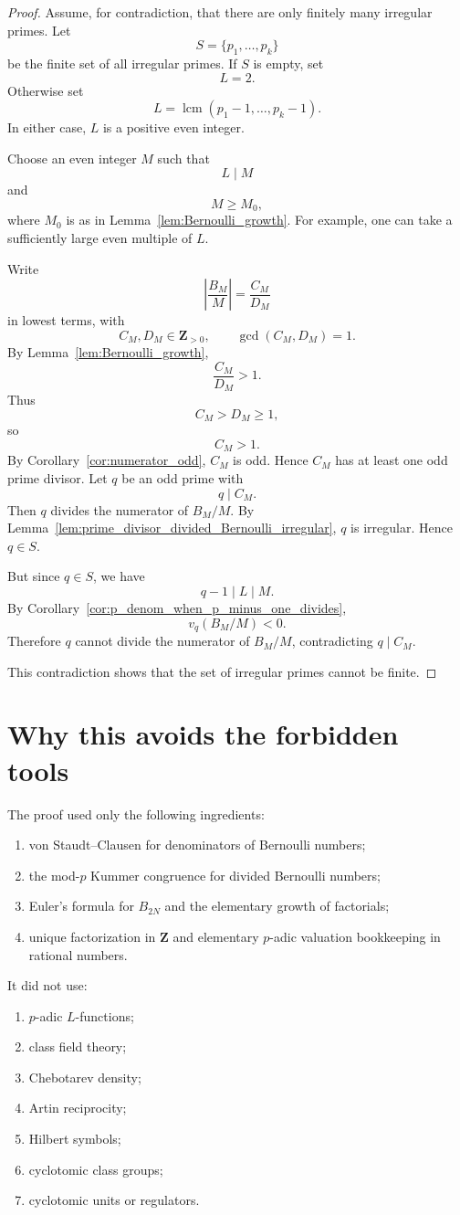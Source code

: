 \documentclass[11pt]{article}
\newcommand{\Z}{\mathbf Z}
\newcommand{\lcm}{\operatorname{lcm}}
\begin{document}
\begin{proof}
Assume, for contradiction, that there are only finitely many irregular primes.  Let
\[
  S=\{p_1,\dots,p_k\}
\]
be the finite set of all irregular primes.  If $S$ is empty, set
\[
  L=2.
\]
Otherwise set
\[
  L=\lcm(p_1-1,\dots,p_k-1).
\]
In either case, $L$ is a positive even integer.

Choose an even integer $M$ such that
\[
  L\mid M
\]
and
\[
  M\ge M_0,
\]
where $M_0$ is as in Lemma~\ref{lem:Bernoulli_growth}.  For example, one can take a sufficiently large even multiple of $L$.

Write
\[
  \left|\frac{B_M}{M}\right|=\frac{C_M}{D_M}
\]
in lowest terms, with
\[
  C_M,D_M\in\Z_{>0},\qquad \gcd(C_M,D_M)=1.
\]
By Lemma~\ref{lem:Bernoulli_growth},
\[
  \frac{C_M}{D_M}>1.
\]
Thus
\[
  C_M>D_M\ge 1,
\]
so
\[
  C_M>1.
\]
By Corollary~\ref{cor:numerator_odd}, $C_M$ is odd.  Hence $C_M$ has at least one odd prime divisor.  Let $q$ be an odd prime with
\[
  q\mid C_M.
\]
Then $q$ divides the numerator of $B_M/M$.  By Lemma~\ref{lem:prime_divisor_divided_Bernoulli_irregular}, $q$ is irregular.  Hence $q\in S$.

But since $q\in S$, we have
\[
  q-1\mid L\mid M.
\]
By Corollary~\ref{cor:p_denom_when_p_minus_one_divides},
\[
  v_q(B_M/M)<0.
\]
Therefore $q$ cannot divide the numerator of $B_M/M$, contradicting $q\mid C_M$.

This contradiction shows that the set of irregular primes cannot be finite.
\end{proof}

\section{Why this avoids the forbidden tools}

The proof used only the following ingredients:
\begin{enumerate}[label=(\arabic*)]
  \item von Staudt--Clausen for denominators of Bernoulli numbers;
  \item the mod-$p$ Kummer congruence for divided Bernoulli numbers;
  \item Euler's formula for $B_{2N}$ and the elementary growth of factorials;
  \item unique factorization in $\Z$ and elementary $p$-adic valuation bookkeeping in rational numbers.
\end{enumerate}

It did not use:
\begin{enumerate}[label=(\alph*)]
  \item $p$-adic $L$-functions;
  \item class field theory;
  \item Chebotarev density;
  \item Artin reciprocity;
  \item Hilbert symbols;
  \item cyclotomic class groups;
  \item cyclotomic units or regulators.
\end{enumerate}
\end{document}
